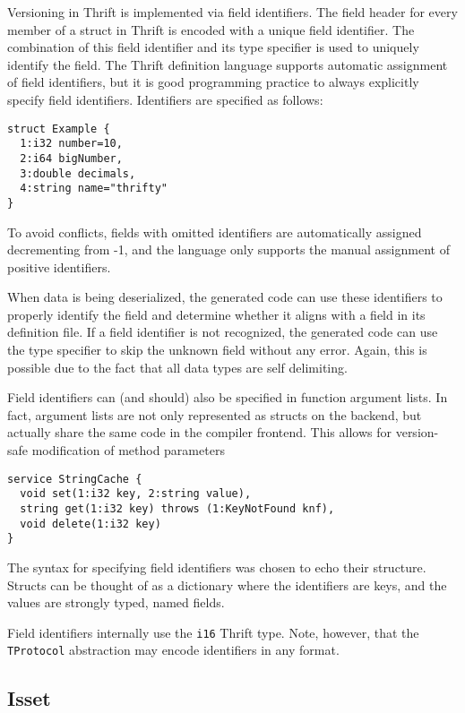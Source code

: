 \documentclass[nocopyrightspace,blockstyle]{sigplanconf}
\begin{document}
Versioning in Thrift is implemented via field identifiers. The field header
for every member of a struct in Thrift is encoded with a unique field
identifier. The combination of this field identifier and its type specifier
is used to uniquely identify the field. The Thrift definition language
supports automatic assignment of field identifiers, but it is good
programming practice to always explicitly specify field identifiers.
Identifiers are specified as follows:

\begin{verbatim}
struct Example {
  1:i32 number=10,
  2:i64 bigNumber,
  3:double decimals,
  4:string name="thrifty"
}\end{verbatim}

To avoid conflicts, fields with omitted identifiers are automatically assigned
decrementing from -1, and the language only supports the manual assignment of
positive identifiers.

When data is being deserialized, the generated code can use these identifiers
to properly identify the field and determine whether it aligns with a field in
its definition file. If a field identifier is not recognized, the generated
code can use the type specifier to skip the unknown field without any error.
Again, this is possible due to the fact that all data types are self
delimiting.

Field identifiers can (and should) also be specified in function argument
lists. In fact, argument lists are not only represented as structs on the
backend, but actually share the same code in the compiler frontend. This
allows for version-safe modification of method parameters

\begin{verbatim}
service StringCache {
  void set(1:i32 key, 2:string value),
  string get(1:i32 key) throws (1:KeyNotFound knf),
  void delete(1:i32 key) 
}
\end{verbatim}

The syntax for specifying field identifiers was chosen to echo their structure.
Structs can be thought of as a dictionary where the identifiers are keys, and
the values are strongly typed, named fields.

Field identifiers internally use the \texttt{i16} Thrift type. Note, however,
that the \texttt{TProtocol} abstraction may encode identifiers in any format.

\subsection{Isset}
\end{document}
